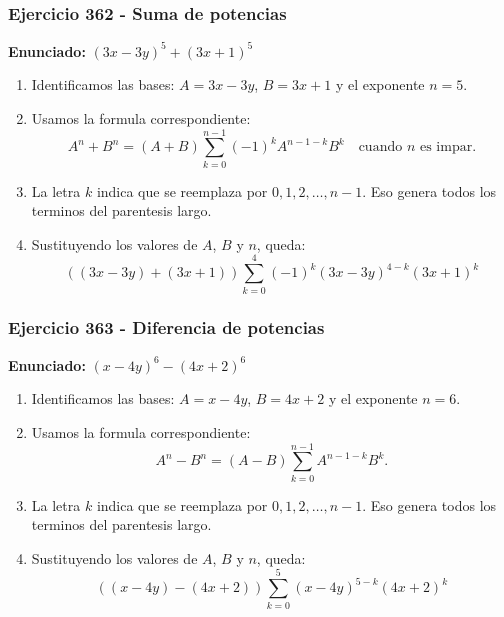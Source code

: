 \documentclass[11pt,a4paper]{article}
\begin{document}
\subsubsection*{Ejercicio 362 - Suma de potencias}
\textbf{Enunciado:} $ \left(3 x - 3 y\right)^{5}+\left(3 x + 1\right)^{5} $\par
\begin{enumerate}[leftmargin=2em]
\item Identificamos las bases: \(A=3 x - 3 y\), \(B=3 x + 1\) y el exponente \(n=5\).
\item Usamos la formula correspondiente: \[A^n+B^n=(A+B)\sum_{k=0}^{n-1}(-1)^kA^{n-1-k}B^k\quad\text{cuando }n\text{ es impar}.\]
\item La letra \(k\) indica que se reemplaza por \(0,1,2,\ldots,n-1\). Eso genera todos los terminos del parentesis largo.
\item Sustituyendo los valores de \(A\), \(B\) y \(n\), queda: \[\boxed{\left(\left(3 x - 3 y\right)+\left(3 x + 1\right)\right)\sum_{k=0}^{4}(-1)^k\left(3 x - 3 y\right)^{4-k}\left(3 x + 1\right)^k}\]
\end{enumerate}

\vspace{0.2cm}
\subsubsection*{Ejercicio 363 - Diferencia de potencias}
\textbf{Enunciado:} $ \left(x - 4 y\right)^{6}-\left(4 x + 2\right)^{6} $\par
\begin{enumerate}[leftmargin=2em]
\item Identificamos las bases: \(A=x - 4 y\), \(B=4 x + 2\) y el exponente \(n=6\).
\item Usamos la formula correspondiente: \[A^n-B^n=(A-B)\sum_{k=0}^{n-1}A^{n-1-k}B^k.\]
\item La letra \(k\) indica que se reemplaza por \(0,1,2,\ldots,n-1\). Eso genera todos los terminos del parentesis largo.
\item Sustituyendo los valores de \(A\), \(B\) y \(n\), queda: \[\boxed{\left(\left(x - 4 y\right)-\left(4 x + 2\right)\right)\sum_{k=0}^{5}\left(x - 4 y\right)^{5-k}\left(4 x + 2\right)^k}\]
\end{enumerate}

\vspace{0.2cm}
\end{document}
